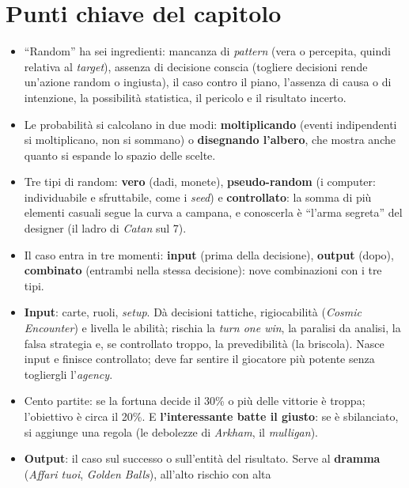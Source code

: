 \section*{Punti chiave del capitolo}

\begin{itemize}
  \item ``Random'' ha sei ingredienti: mancanza di \emph{pattern} (vera o percepita, quindi
        relativa al \emph{target}), assenza di decisione conscia (togliere decisioni rende
        un'azione random o ingiusta), il caso contro il piano, l'assenza di causa o di
        intenzione, la possibilità statistica, il pericolo e il risultato incerto.
  \item Le probabilità si calcolano in due modi: \textbf{moltiplicando} (eventi indipendenti
        si moltiplicano, non si sommano) o \textbf{disegnando l'albero}, che mostra anche
        quanto si espande lo spazio delle scelte.
  \item Tre tipi di random: \textbf{vero} (dadi, monete), \textbf{pseudo-random} (i computer:
        individuabile e sfruttabile, come i \emph{seed}) e \textbf{controllato}: la somma di più
        elementi casuali segue la curva a campana, e conoscerla è ``l'arma segreta'' del
        designer (il ladro di \emph{Catan} sul 7).
  \item Il caso entra in tre momenti: \textbf{input} (prima della decisione), \textbf{output}
        (dopo), \textbf{combinato} (entrambi nella stessa decisione): nove combinazioni con i
        tre tipi.
  \item \textbf{Input}: carte, ruoli, \emph{setup}. Dà decisioni tattiche, rigiocabilità
        (\emph{Cosmic Encounter}) e livella le abilità; rischia la \emph{turn one win}, la
        paralisi da analisi, la falsa strategia e, se controllato troppo, la prevedibilità
        (la briscola). Nasce input e finisce controllato; deve far sentire il giocatore più
        potente senza togliergli l'\emph{agency}.
  \item Cento partite: se la fortuna decide il 30\% o più delle vittorie è troppa; l'obiettivo
        è circa il 20\%. E \textbf{l'interessante batte il giusto}: se è sbilanciato, si
        aggiunge una regola (le debolezze di \emph{Arkham}, il \emph{mulligan}).
  \item \textbf{Output}: il caso sul successo o sull'entità del risultato. Serve al
        \textbf{dramma} (\emph{Affari tuoi}, \emph{Golden Balls}), all'alto rischio con alta

\end{itemize}
